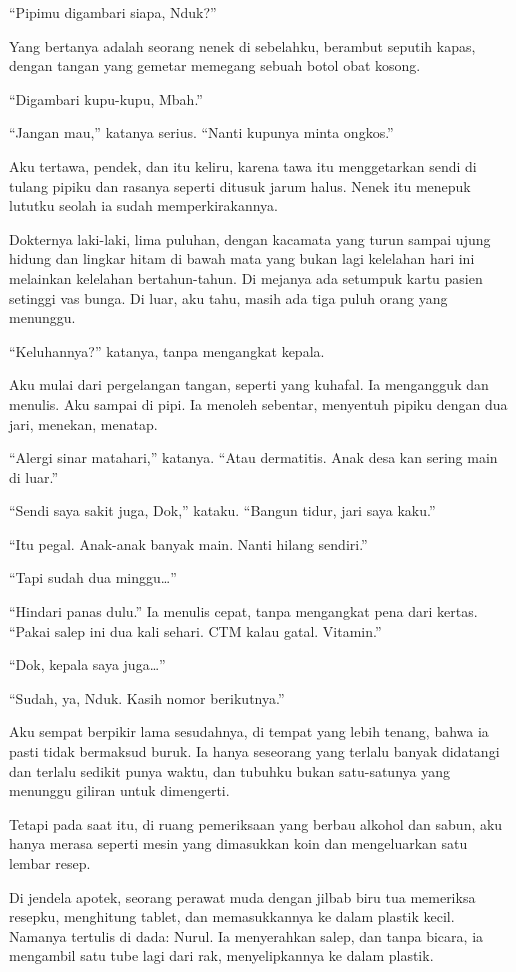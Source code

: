 \documentclass[11pt,twoside,openany]{book}
\makeatletter
\newcommand{\scenebreak}{\par\vspace{0.9em}{\centering\textsc{*\hspace{0.7em}*\hspace{0.7em}*}\par}\vspace{0.9em}\@afterindentfalse\@afterheading}
\makeatother
\begin{document}
``Pipimu digambari siapa, Nduk?''

Yang bertanya adalah seorang nenek di sebelahku, berambut seputih kapas, dengan tangan yang gemetar memegang sebuah botol obat kosong.

``Digambari kupu-kupu, Mbah.''

``Jangan mau,'' katanya serius. ``Nanti kupunya minta ongkos.''

Aku tertawa, pendek, dan itu keliru, karena tawa itu menggetarkan sendi di tulang pipiku dan rasanya seperti ditusuk jarum halus. Nenek itu menepuk lututku seolah ia sudah memperkirakannya.

\scenebreak
Dokternya laki-laki, lima puluhan, dengan kacamata yang turun sampai ujung hidung dan lingkar hitam di bawah mata yang bukan lagi kelelahan hari ini melainkan kelelahan bertahun-tahun. Di mejanya ada setumpuk kartu pasien setinggi vas bunga. Di luar, aku tahu, masih ada tiga puluh orang yang menunggu.

``Keluhannya?'' katanya, tanpa mengangkat kepala.

Aku mulai dari pergelangan tangan, seperti yang kuhafal. Ia mengangguk dan menulis. Aku sampai di pipi. Ia menoleh sebentar, menyentuh pipiku dengan dua jari, menekan, menatap.

``Alergi sinar matahari,'' katanya. ``Atau dermatitis. Anak desa kan sering main di luar.''

``Sendi saya sakit juga, Dok,'' kataku. ``Bangun tidur, jari saya kaku.''

``Itu pegal. Anak-anak banyak main. Nanti hilang sendiri.''

``Tapi sudah dua minggu\ldots{}''

``Hindari panas dulu.'' Ia menulis cepat, tanpa mengangkat pena dari kertas. ``Pakai salep ini dua kali sehari. CTM kalau gatal. Vitamin.''

``Dok, kepala saya juga\ldots{}''

``Sudah, ya, Nduk. Kasih nomor berikutnya.''

Aku sempat berpikir lama sesudahnya, di tempat yang lebih tenang, bahwa ia pasti tidak bermaksud buruk. Ia hanya seseorang yang terlalu banyak didatangi dan terlalu sedikit punya waktu, dan tubuhku bukan satu-satunya yang menunggu giliran untuk dimengerti.

Tetapi pada saat itu, di ruang pemeriksaan yang berbau alkohol dan sabun, aku hanya merasa seperti mesin yang dimasukkan koin dan mengeluarkan satu lembar resep.

\scenebreak
Di jendela apotek, seorang perawat muda dengan jilbab biru tua memeriksa resepku, menghitung tablet, dan memasukkannya ke dalam plastik kecil. Namanya tertulis di dada: Nurul. Ia menyerahkan salep, dan tanpa bicara, ia mengambil satu tube lagi dari rak, menyelipkannya ke dalam plastik.
\end{document}
